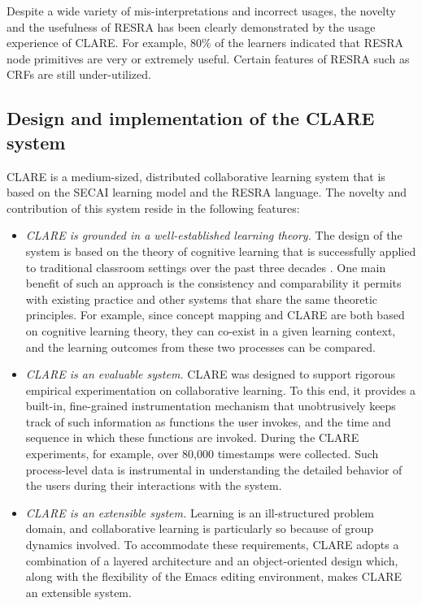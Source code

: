 Despite a wide variety of mis-interpretations and incorrect usages, the
novelty and the usefulness of RESRA has been clearly demonstrated by the
usage experience of CLARE. For example, 80\% of the learners indicated that
RESRA node primitives are very or extremely useful. Certain features of
RESRA such as CRFs are still under-utilized.


\subsection{Design and implementation of the CLARE system}

CLARE is a medium-sized, distributed collaborative learning system that is
based on the SECAI learning model and the RESRA language. The novelty and
contribution of this system reside in the following features:

\begin{itemize}
\item {\it CLARE is grounded in a well-established learning theory.\/}
  The design of the system is based on the theory of cognitive learning
  that is successfully applied to traditional classroom settings
  over the past three decades \cite{Novak84}. One main benefit of such an
  approach is the consistency and comparability it permits with existing
  practice and other systems that share the same theoretic principles.
  For example, since concept mapping and CLARE are both based on
  cognitive learning theory, they can co-exist in a given learning
  context, and the learning outcomes from these two processes can be
  compared.
      
\item {\it CLARE is an evaluable system.\/} CLARE was designed to support
  rigorous empirical experimentation on collaborative learning.  To this
  end, it provides a built-in, fine-grained instrumentation mechanism that
  unobtrusively keeps track of such information as functions the user
  invokes, and the time and sequence in which these functions are invoked.
  During the CLARE experiments, for example, over 80,000 timestamps were
  collected.  Such process-level data is instrumental in understanding the
  detailed behavior of the users during their interactions with the system.
  
\item {\it CLARE is an extensible system.\/} Learning is an
  ill-structured problem domain, and collaborative learning is particularly
  so because of group dynamics involved. To accommodate these requirements,
  CLARE adopts a combination of a layered architecture and an
  object-oriented design which, along with the flexibility of the Emacs
  editing environment, makes CLARE an extensible system.
\end{itemize}


